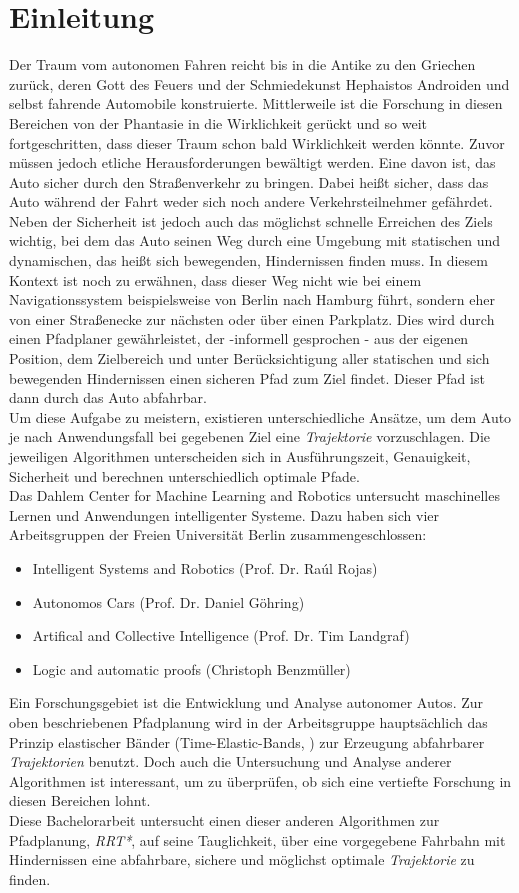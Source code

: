 \section{Einleitung}
Der Traum vom autonomen Fahren reicht bis in die Antike zu den Griechen zurück, deren Gott des Feuers und der Schmiedekunst Hephaistos Androiden und selbst fahrende Automobile konstruierte. Mittlerweile ist die Forschung in diesen Bereichen von der Phantasie in die Wirklichkeit gerückt und so weit fortgeschritten, dass dieser Traum schon bald Wirklichkeit werden könnte. Zuvor müssen jedoch etliche Herausforderungen bewältigt werden. Eine davon ist, das Auto sicher durch den Straßenverkehr zu bringen. Dabei heißt sicher, dass das Auto während der Fahrt weder sich noch andere Verkehrsteilnehmer gefährdet. Neben der Sicherheit ist jedoch auch das möglichst schnelle Erreichen des Ziels wichtig, bei dem das Auto seinen Weg durch eine Umgebung mit statischen und dynamischen, das heißt sich bewegenden, Hindernissen finden muss. In diesem Kontext ist noch zu erwähnen, dass dieser Weg nicht wie bei einem Navigationssystem beispielsweise von Berlin nach Hamburg führt, sondern eher von einer Straßenecke zur nächsten oder über einen Parkplatz. Dies wird durch einen Pfadplaner gewährleistet, der -informell gesprochen - aus der eigenen Position, dem Zielbereich und unter Berücksichtigung aller statischen und sich bewegenden Hindernissen einen sicheren Pfad zum Ziel findet. Dieser Pfad ist dann durch das Auto abfahrbar.\\
Um diese Aufgabe zu meistern, existieren unterschiedliche Ansätze, um dem Auto je nach Anwendungsfall bei gegebenen Ziel eine \textit{Trajektorie} vorzuschlagen. Die jeweiligen Algorithmen unterscheiden sich in Ausführungszeit, Genauigkeit, Sicherheit und berechnen unterschiedlich optimale Pfade.  \\
Das Dahlem Center for Machine Learning and Robotics untersucht maschinelles Lernen und Anwendungen intelligenter Systeme. Dazu haben sich vier Arbeitsgruppen der Freien Universität Berlin zusammengeschlossen:
\begin{itemize}
\item Intelligent Systems and Robotics (Prof. Dr. Raúl Rojas)
\item Autonomos Cars (Prof. Dr. Daniel Göhring)
\item Artifical and Collective Intelligence (Prof. Dr. Tim Landgraf)
\item Logic and automatic proofs (Christoph Benzmüller)
\end{itemize}
Ein Forschungsgebiet ist die Entwicklung und Analyse autonomer Autos. Zur oben beschriebenen Pfadplanung wird in der Arbeitsgruppe hauptsächlich das Prinzip elastischer Bänder (Time-Elastic-Bands, \citep[vgl.][]{RoeHoBe}) zur Erzeugung abfahrbarer \textit{Trajektorien} benutzt. Doch auch die Untersuchung und Analyse anderer Algorithmen ist interessant, um zu überprüfen, ob sich eine vertiefte Forschung in diesen Bereichen lohnt. \\ 
Diese Bachelorarbeit untersucht einen dieser anderen Algorithmen zur Pfadplanung, \textit{RRT*}, auf seine Tauglichkeit, über eine vorgegebene Fahrbahn mit Hindernissen eine abfahrbare, sichere und möglichst optimale \textit{Trajektorie} zu finden. 

